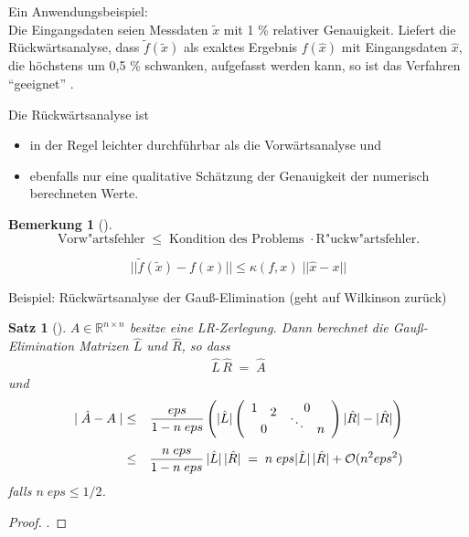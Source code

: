 \documentclass[ngerman,fontsize=11pt, paper=a4, parskip=half, titlepage=true, toc=bib]{scrbook}
\theoremstyle{definition}
\newtheorem{Bem}[Def]{Bemerkung}	%
\theoremstyle{plain}
\newtheorem{Satz}[Def]{Satz}		%
\newcommand{\R}{\mathds{R}}
\newcommand{\subsectione}[1]{\addtocounter{Def}{1}\subsection{#1}}
\newenvironment{Satze}[1][]{ %
	\begin{Satz}[#1]
}
{
	\end{Satz}
	\addtocounter{subsection}{1}
}
\newenvironment{Beme}[1][]{ %
	\begin{Bem}[#1]
	}
	{
	\end{Bem}
	\addtocounter{subsection}{1}
}
\begin{document}
  Ein Anwendungsbeispiel:\\
  Die Eingangsdaten seien Messdaten $\tilde{x}$  mit 1 \% relativer Genauigkeit. 
  Liefert die Rückwärtsanalyse, dass $\tilde{f} (\tilde{x})$ als exaktes Ergebnis 
  $f(\hat x)$ mit Eingangsdaten $\hat x$, 
  die höchstens um 0,5 \% schwanken, aufgefasst werden kann,
  so ist das Verfahren \enquote{geeignet} . 
  
  Die Rückwärtsanalyse ist
  \begin{itemize}
  \item in der Regel leichter durchführbar als die
    Vorwärtsanalyse  und 
  \item ebenfalls nur eine qualitative Schätzung der
    Genauigkeit der numerisch berechneten Werte.
  \end{itemize}
  
  \begin{Beme}
  	$$ \mbox{Vorw"artsfehler} \; \leq \; \mbox{Kondition des
  		Problems } \cdot \mbox{R"uckw"artsfehler} .$$
  	
  	$$ ||\tilde f (\tilde x)  - f(x)|| \leq \kappa (f,x) \; || \hat x -x|| $$
  	
  	Beispiel: Rückwärtsanalyse der Gauß-Elimination
  	(geht auf Wilkinson zurück)
  \end{Beme}
  
  
  \begin{Satze}
  		$A \in \R^{n\times n}$ besitze eine LR-Zerlegung. Dann berechnet die
  		Gauß-Elimination Matrizen $\hat{L}$ und $\hat{R}$,
  		so dass
  		\begin{gather*}\hat{L}\,\hat{R}\; = \;\hat{A}\end{gather*}
  		und
  		\begin{align*}
  		\mid \hat{ A} -  A \mid & \leq & \frac{eps}{1 -n \;eps}
  		\left( | \hat{ L} | \left( \begin{array}{cccc}
  		1 && \multicolumn{2}{c}{0}\\[-2ex] & 2
  		&&\\[-2ex]
  		&&\ddots & \\[-2ex]  \multicolumn{2}{c}{0} && n
  		\end{array} \right)
  		| \hat{ R} | - |\hat{ R}| \right)
  		\\[1ex]
  		& \leq & \frac{n \; eps}{1- n \;eps}\, | \hat{ L} | \,
  		|\hat{ R}| \; 
  		= \; n \; eps  | \hat{ L} | \,  |\hat{ R}| +
  		\mathcal{O}( n^2 eps^2)
  		\end{align*}
  		falls $n\;eps \leq 1/2$.
  \end{Satze}
    		\begin{proof}
    			\cite[siehe][]{stoerbulirsch}.
    		\end{proof}
  
\end{document}
